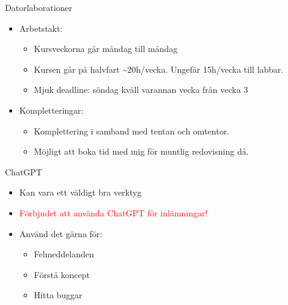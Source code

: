 \documentclass[
  10pt,
  ignorenonframetext,
]{beamer}
\providecommand{\tightlist}{%
  \setlength{\itemsep}{0pt}\setlength{\parskip}{0pt}}
\begin{document}
\begin{frame}{Datorlaborationer}
\protect\hypertarget{datorlaborationer-1}{}
\begin{itemize}
\tightlist
\item
  Arbetstakt:

  \begin{itemize}
  \tightlist
  \item
    Kursveckorna går måndag till måndag
  \item
    Kursen går på halvfart \textasciitilde20h/vecka. Ungefär 15h/vecka
    till labbar.
  \item
    Mjuk deadline: söndag kväll varannan vecka från vecka 3
  \end{itemize}
\item
  Kompletteringar:

  \begin{itemize}
  \tightlist
  \item
    Komplettering i samband med tentan och omtentor.
  \item
    Möjligt att boka tid med mig för muntlig redovisning då.
  \end{itemize}
\end{itemize}
\end{frame}

\begin{frame}{ChatGPT}
\protect\hypertarget{chatgpt}{}
\begin{itemize}
\tightlist
\item
  Kan vara ett väldigt bra verktyg
\item
  \textcolor{red}{Förbjudet att använda ChatGPT för inlämningar!}
\item
  Använd det gärna för:

  \begin{itemize}
  \tightlist
  \item
    Felmeddelanden
  \item
    Förstå koncept
  \item
    Hitta buggar
  \end{itemize}
\end{itemize}
\end{frame}
\end{document}
